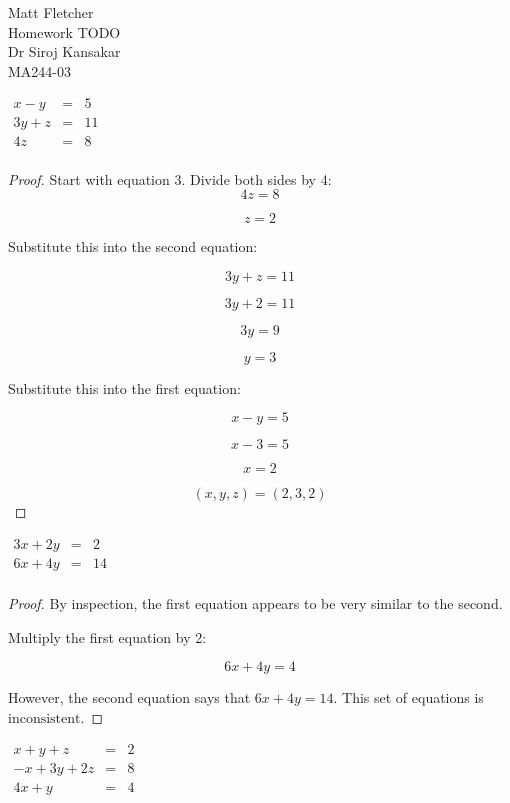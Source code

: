 \documentclass[10pt]{article}
\newenvironment{problem}[2][Problem]{\begin{trivlist}
\item[\hskip \labelsep {\bfseries #1}\hskip \labelsep {\bfseries #2.}]}{\end{trivlist}}
\begin{document}
 

 
Matt Fletcher
\\Homework TODO
\\Dr Siroj Kansakar
\\MA244-03

 
\begin{problem}{1.1.28}
$
\begin{array}
	 {rcr} x-y & = & 5 \\ 
	     3y+z & = & 11 \\
       	4z  & = & 8 \\
\end{array}
$
\end{problem}
 
\begin{proof}
Start with equation 3. Divide both sides by 4: \\
\[4z=8\]

\[\boxed{z=2}\]

Substitute this into the second equation:

\[3y+z = 11\]

\[3y+2=11\]

\[3y=9\]

\[\boxed{y=3}\]

Substitute this into the first equation:

\[x-y=5\]

\[x-3=5\]

\[\boxed{x=2}\]

\[\boxed{(x,y,z)=(2,3,2)}\]
\end{proof}



\begin{problem}{1.1.38}
	$
	\begin{array}
	{lcr} 3x+2y & = & 2 \\ 
	6x+4y & = & 14 \\
	\end{array}
	$
\end{problem}

\begin{proof}
	By inspection, the first equation appears to be very similar to the second. 
	
	Multiply the first equation by 2:
	
	\[6x+4y = 4\]
	
	However, the second equation says that $6x+4y = 14$. This set of equations is $\boxed{\text{inconsistent}}$.
\end{proof}

\begin{problem}{1.1.48}
$	
	\begin{array}
	{lcr} 
	x+y+z& = & 2 \\ 
	-x+3y+2z & = & 8 \\
	4x+y & = & 4 \\
	\end{array}
$
\end{problem}
\end{document}
